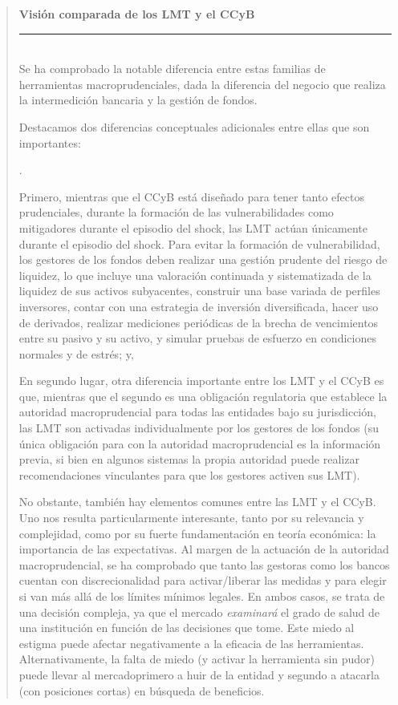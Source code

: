 \documentclass[10pt,a4paper]{article}
\newcounter{numitem}
\newenvironment{lnum}
      {\begin{list}{\arabic{numitem}.}{%
          \usecounter{numitem}%
          \setlength{\leftmargin}{1cm}%
          \setlength{\parskip}{3pt}%
          \setlength{\itemsep}{0pt}%
          \setlength{\parsep}{0pt}%
      }}
      {\end{list}}
\newenvironment{specialblock}[1]{%
      \begin{quote} %
      \small %
      \noindent\textbf{#1}\\[-0.3em] %
      \rule{\linewidth}{0.4pt}\\[0.6em]}{
      \end{quote}}
\begin{document}
\begin{specialblock}{Visión comparada de los LMT y el CCyB}
    Se ha comprobado la notable diferencia entre estas familias de herramientas macroprudenciales, dada la diferencia del negocio que realiza la intermedición bancaria y la gestión de fondos. 
    
    Destacamos dos diferencias conceptuales adicionales entre ellas que son importantes:
    \begin{lnum}
        \item Primero, mientras que el CCyB está diseñado para tener tanto efectos prudenciales, durante la formación de las vulnerabilidades como mitigadores durante el episodio del shock, las LMT actúan únicamente durante el episodio del shock. Para evitar la formación de vulnerabilidad, los gestores de los fondos deben realizar una gestión prudente del riesgo de liquidez, lo que incluye una valoración continuada y sistematizada de la liquidez de sus activos subyacentes, construir una base variada de perfiles inversores, contar con una estrategia de inversión diversificada, hacer uso de derivados, realizar mediciones periódicas de la brecha de vencimientos entre su pasivo y su activo, y simular pruebas de esfuerzo en condiciones normales y de estrés; y,
        \item En segundo lugar, otra diferencia importante entre los LMT y el CCyB es que, mientras que el segundo es una obligación regulatoria que establece la autoridad macroprudencial para todas las entidades bajo su jurisdicción, las LMT son activadas individualmente por los gestores de los fondos (su única obligación para con la autoridad macroprudencial es la información previa, si bien en algunos sistemas la propia autoridad puede realizar recomendaciones vinculantes para que los gestores activen sus LMT). 
    \end{lnum}

    No obstante, también hay elementos comunes entre las LMT y el CCyB. Uno nos resulta particularmente interesante, tanto por su relevancia y complejidad, como por su fuerte fundamentación en teoría económica: la importancia de las expectativas. Al margen de la actuación de la autoridad macroprudencial, se ha comprobado que tanto las gestoras como los bancos cuentan con discrecionalidad para activar/liberar las medidas y para elegir si van más allá de los límites mínimos legales. En ambos casos, se trata de una decisión compleja, ya que el mercado \textit{examinará} el grado de salud de una institución en función de las decisiones que tome. Este miedo al estigma puede afectar negativamente a la eficacia de las herramientas. Alternativamente, la falta de miedo (y activar la herramienta sin pudor) puede llevar al mercadoprimero a huir de la entidad y segundo a atacarla (con posiciones cortas) en búsqueda de beneficios.
\end{specialblock}
\end{document}
